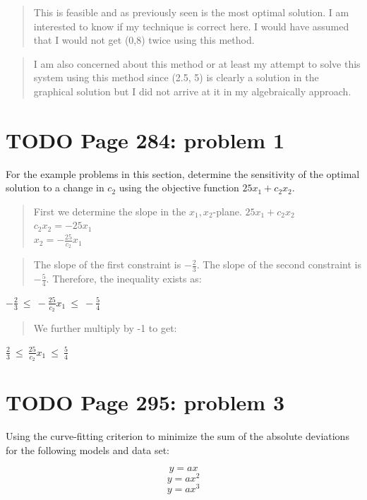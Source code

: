 \documentclass[]{article}
\begin{document}
\begin{quote}
This is feasible and as previously seen is the most optimal solution. I
am interested to know if my technique is correct here. I would have
assumed that I would not get (0,8) twice using this method.
\end{quote}

\begin{quote}
I am also concerned about this method or at least my attempt to solve
this system using this method since (2.5, 5) is clearly a solution in
the graphical solution but I did not arrive at it in my algebraically
approach.
\end{quote}

\section{TODO Page 284: problem 1}\label{todo-page-284-problem-1}

For the example problems in this section, determine the sensitivity of
the optimal solution to a change in \(c_2\) using the objective function
\(25x_1 + c_2x_2\).

\begin{quote}
First we determine the slope in the \(x_1,x_2\)-plane.
\(25x_1 + c_2x_2\)\\
\(c_2x_2 = -25x_1\)\\
\(x_2 = -\frac{25}{c_2}x_1\)
\end{quote}

\begin{quote}
The slope of the first constraint is \(-\frac{2}{3}\). The slope of the
second constraint is \(-\frac{5}{4}\). Therefore, the inequality exists
as:
\end{quote}

\(-\frac{2}{3}~\leq~-\frac{25}{c_2}x_1~\leq~-\frac{5}{4}\)

\begin{quote}
We further multiply by -1 to get:
\end{quote}

\(\frac{2}{3}~\leq~\frac{25}{c_2}x_1~\leq~\frac{5}{4}\)

\section{TODO Page 295: problem 3}\label{todo-page-295-problem-3}

Using the curve-fitting criterion to minimize the sum of the absolute
deviations for the following models and data set:

\[y = ax\] \[y = ax^2\] \[y = ax^3\]
\end{document}
